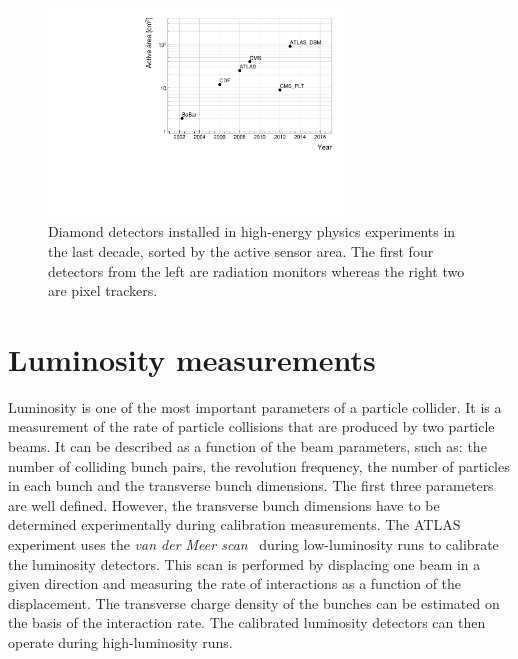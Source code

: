 \begin{figure}[!t]
\centering
\includegraphics[width=0.7\textwidth]{../scripts/04_charge_monitoring/plots/detArea}
\caption{Diamond detectors installed in high-energy physics experiments in the last decade, sorted by the active sensor area. The first four detectors from the left are radiation monitors whereas the right two are pixel trackers.}
\label{fig:areavsyear}
\end{figure}

\section{Luminosity measurements}
\label{sec:lumi}
Luminosity is one of the most important parameters of a particle collider. It is a measurement of the rate of particle collisions that are produced by two particle beams. It can be described as a function of the beam parameters, such as: the number of colliding bunch pairs, the revolution frequency, the number of particles in each bunch and the transverse bunch dimensions. The first three parameters are well defined. However, the transverse bunch dimensions have to be determined experimentally during calibration measurements. The ATLAS experiment uses the \emph{van der Meer scan}~\cite{ATLAS-CONF-2010-102} during low-luminosity runs to calibrate the luminosity detectors. This scan is performed by displacing one beam in a given direction and measuring the rate of interactions as a function of the displacement. The transverse charge density of the bunches can be estimated on the basis of the interaction rate. The calibrated luminosity detectors can then operate during high-luminosity runs.

